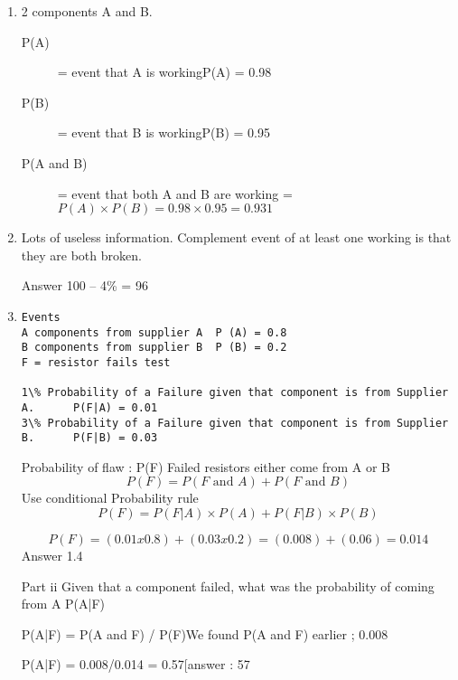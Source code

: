 \documentclass[]{report}
\begin{document}
\begin{enumerate}
\item 
2 components A and B.
\begin{description}
\item[P(A)] = event that A is workingP(A) = 0.98
\item[P(B)] = event that B is workingP(B) = 0.95
\item[P(A and B)] = event that both A and B are working = $P(A) \times P(B) = 0.98 \times 0.95 = 0.931$
\end{description}

\item 
Lots of useless information.
Complement event of at least one working is that they are both broken.

Answer  100 – 4\% = 96%

\item 


\begin{verbatim}
Events 
A components from supplier A  P (A) = 0.8 
B components from supplier B  P (B) = 0.2 
F = resistor fails test

1\% Probability of a Failure given that component is from Supplier A.      P(F|A) = 0.01
3\% Probability of a Failure given that component is from Supplier B.      P(F|B) = 0.03

\end{verbatim}
Probability of flaw : P(F)
Failed resistors either come from A or B
\[P( F) =  P ( F \mbox{ and } A)  +  P( F \mbox{ and } B)\]
Use conditional Probability  rule
\[P(F) = P(F|A)\times P(A)  + P(F|B)\times P(B)\]

\[P(F)  =  ( 0.01 x 0.8 ) + ( 0.03 x 0.2) = (0.008) + (0.06) = 0.014\]
Answer 1.4%


Part ii
Given that a component failed, what was the probability of coming from A
P(A|F) 

P(A|F) = P(A and F)  / P(F)We found P(A and F) earlier ; 0.008

P(A|F) = 0.008/0.014 =  0.57[answer : 57%




\end{enumerate}











\end{document}
